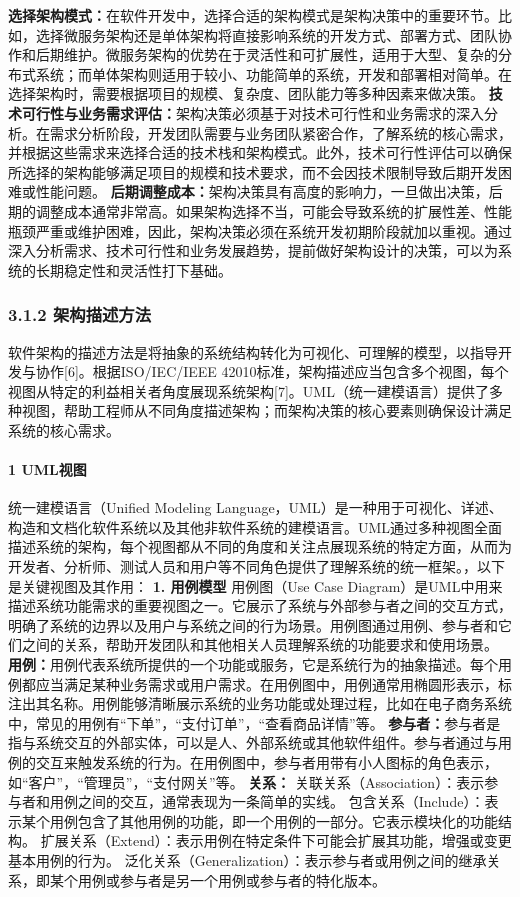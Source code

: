 \textbf{选择架构模式：}在软件开发中，选择合适的架构模式是架构决策中的重要环节。比如，选择微服务架构还是单体架构将直接影响系统的开发方式、部署方式、团队协作和后期维护。微服务架构的优势在于灵活性和可扩展性，适用于大型、复杂的分布式系统；而单体架构则适用于较小、功能简单的系统，开发和部署相对简单。在选择架构时，需要根据项目的规模、复杂度、团队能力等多种因素来做决策。 \textbf{技术可行性与业务需求评估：}架构决策必须基于对技术可行性和业务需求的深入分析。在需求分析阶段，开发团队需要与业务团队紧密合作，了解系统的核心需求，并根据这些需求来选择合适的技术栈和架构模式。此外，技术可行性评估可以确保所选择的架构能够满足项目的规模和技术要求，而不会因技术限制导致后期开发困难或性能问题。 \textbf{后期调整成本：}架构决策具有高度的影响力，一旦做出决策，后期的调整成本通常非常高。如果架构选择不当，可能会导致系统的扩展性差、性能瓶颈严重或维护困难，因此，架构决策必须在系统开发初期阶段就加以重视。通过深入分析需求、技术可行性和业务发展趋势，提前做好架构设计的决策，可以为系统的长期稳定性和灵活性打下基础。 \subsubsection{3.1.2 架构描述方法}\label{ux67b6ux6784ux63cfux8ff0ux65b9ux6cd5} 软件架构的描述方法是将抽象的系统结构转化为可视化、可理解的模型，以指导开发与协作{[}6{]}。根据ISO/IEC/IEEE 42010标准，架构描述应当包含多个视图，每个视图从特定的利益相关者角度展现系统架构{[}7{]}。UML（统一建模语言）提供了多种视图，帮助工程师从不同角度描述架构；而架构决策的核心要素则确保设计满足系统的核心需求。 \paragraph{1 UML视图}\label{umlux89c6ux56fe} 统一建模语言（Unified Modeling Language，UML）是一种用于可视化、详述、构造和文档化软件系统以及其他非软件系统的建模语言。UML通过多种视图全面描述系统的架构，每个视图都从不同的角度和关注点展现系统的特定方面，从而为开发者、分析师、测试人员和用户等不同角色提供了理解系统的统一框架。，以下是关键视图及其作用： \textbf{1. 用例模型} 用例图（Use Case Diagram）是UML中用来描述系统功能需求的重要视图之一。它展示了系统与外部参与者之间的交互方式，明确了系统的边界以及用户与系统之间的行为场景。用例图通过用例、参与者和它们之间的关系，帮助开发团队和其他相关人员理解系统的功能要求和使用场景。 \textbf{用例：}用例代表系统所提供的一个功能或服务，它是系统行为的抽象描述。每个用例都应当满足某种业务需求或用户需求。在用例图中，用例通常用椭圆形表示，标注出其名称。用例能够清晰展示系统的业务功能或处理过程，比如在电子商务系统中，常见的用例有``下单''，``支付订单''，``查看商品详情''等。 \textbf{参与者：}参与者是指与系统交互的外部实体，可以是人、外部系统或其他软件组件。参与者通过与用例的交互来触发系统的行为。在用例图中，参与者用带有小人图标的角色表示，如``客户''，``管理员''，``支付网关''等。 \textbf{关系：} 关联关系（Association）：表示参与者和用例之间的交互，通常表现为一条简单的实线。 包含关系（Include）：表示某个用例包含了其他用例的功能，即一个用例的一部分。它表示模块化的功能结构。 扩展关系（Extend）：表示用例在特定条件下可能会扩展其功能，增强或变更基本用例的行为。 泛化关系（Generalization）：表示参与者或用例之间的继承关系，即某个用例或参与者是另一个用例或参与者的特化版本。 